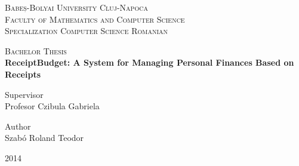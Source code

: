 \begin{titlepage}
    \begin{center}
        \vspace*{1cm}
        
        \Large
        \textsc{Babeș-Bolyai University Cluj-Napoca} \\
		\textsc{Faculty of Mathematics and Computer Science} \\
		\textsc{Specialization Computer Science Romanian}

		\vspace{1.5cm}
        \Huge
        \textsc{Bachelor Thesis} \\[1cm]
        \textbf{ReceiptBudget: A System for Managing Personal Finances Based on Receipts}
\end{center}        

        \vspace{2cm}
		\Large
        \begin{minipage}[t]{0.5\textwidth}
       		Supervisor \\
        	Profesor Czibula Gabriela \\
		\end{minipage}
		\begin{minipage}[t]{0.5\textwidth}
			\begin{flushright}
				Author \\
				Szabó Roland Teodor
			\end{flushright}
		\end{minipage}
        \vfill

        \vspace{0.8cm}
\begin{center}
	\Huge
        2014
\end{center}
        
\end{titlepage}
